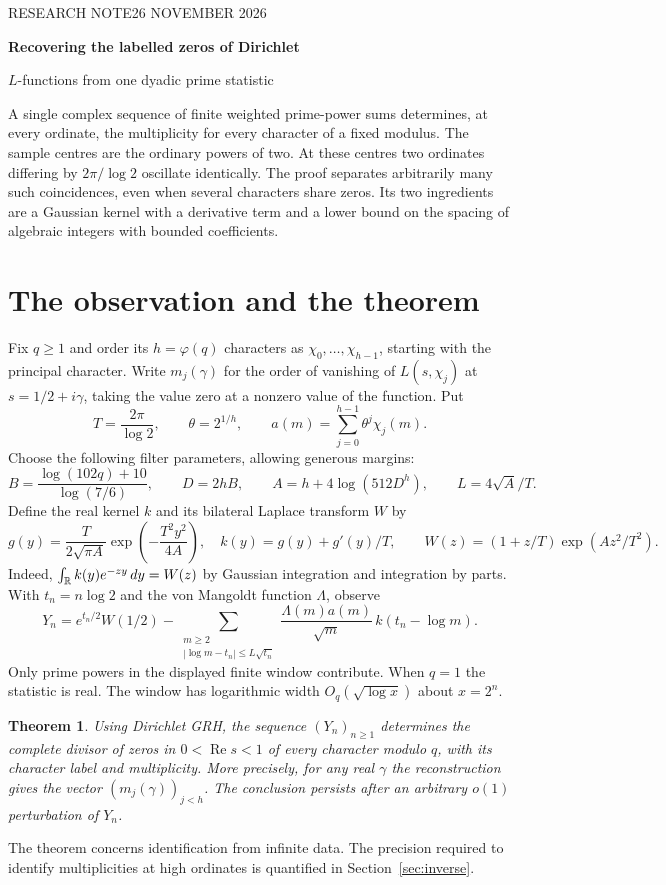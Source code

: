 \documentclass[11pt]{article}
\newtheorem{theorem}{Theorem}\newtheorem{lemma}[theorem]{Lemma}
\newcommand{\re}{\operatorname{Re}}\newcommand{\im}{\operatorname{Im}}
\begin{document}
\thispagestyle{plain}
{\sffamily\small\color{teal} RESEARCH NOTE\hfill 26 NOVEMBER 2026}\par\vspace{8pt}
{\LARGE\bfseries Recovering the labelled zeros of Dirichlet\par
\vspace{2pt} $L$-functions from one dyadic prime statistic\par}
\vspace{8pt}
\noindent A single complex sequence of finite weighted prime-power sums determines, at every ordinate, the multiplicity for every character of a fixed modulus. The sample centres are the ordinary powers of two. At these centres two ordinates differing by $2\pi/\log 2$ oscillate identically. The proof separates arbitrarily many such coincidences, even when several characters share zeros. Its two ingredients are a Gaussian kernel with a derivative term and a lower bound on the spacing of algebraic integers with bounded coefficients.
\section{The observation and the theorem}
Fix $q\ge1$ and order its $h=\varphi(q)$ characters as $\chi_0,\ldots,\chi_{h-1}$, starting with the principal character. Write $m_j(\gamma)$ for the order of vanishing of $L(s,\chi_j)$ at $s=1/2+i\gamma$, taking the value zero at a nonzero value of the function. Put
\[
 T=\frac{2\pi}{\log2},\qquad \theta=2^{1/h},\qquad
 a(m)=\sum_{j=0}^{h-1}\theta^j\chi_j(m).
\]
Choose the following filter parameters, allowing generous margins:
\[
 B=\frac{\log(102q)+10}{\log(7/6)},\qquad D=2hB,\qquad
 A=h+4\log(512D^h),\qquad L=4\sqrt A/T.
\]
Define the real kernel $k$ and its bilateral Laplace transform $W$ by
\[
 g(y)=\frac{T}{2\sqrt{\pi A}}\exp\!\left(-\frac{T^2y^2}{4A}\right),
 \quad k(y)=g(y)+g'(y)/T,\qquad
 W(z)=(1+z/T)\exp(Az^2/T^2).
\]
Indeed, $\int_{\mathbb R} k(y)e^{-zy}\,dy=W(z)$ by Gaussian integration and integration by parts. With $t_n=n\log 2$ and the von Mangoldt function $\Lambda$, observe
\begin{equation}
 Y_n=e^{t_n/2}W(1/2)-
 \sum_{\substack{m\ge 2\\|\log m-t_n|\le L\sqrt{t_n}}}
 \frac{\Lambda(m) a(m)}{\sqrt m}\, k(t_n-\log m).
 \label{eq:obs}
\end{equation}
Only prime powers in the displayed finite window contribute. When $q=1$ the statistic is real. The window has logarithmic width $O_q(\sqrt{\log x})$ about $x=2^n$.
\begin{theorem}\label{th:main}
Using Dirichlet GRH, the sequence $(Y_n)_{n\ge1}$ determines the complete divisor of zeros in $0<\re s<1$ of every character modulo $q$, with its character label and multiplicity. More precisely, for any real $\gamma$ the reconstruction gives the vector $(m_j(\gamma))_{j<h}$. The conclusion persists after an arbitrary $o(1)$ perturbation of $Y_n$.
\end{theorem}
The theorem concerns identification from infinite data. The precision required to identify multiplicities at high ordinates is quantified in Section~\ref{sec:inverse}.
\end{document}
